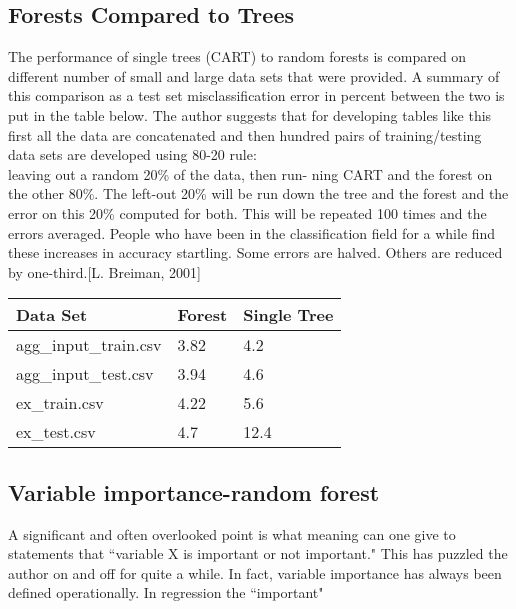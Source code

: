 \documentclass[journal]{/home/hoofar/LatexClasses/IEEEtran}
\begin{document}
\subsection*{Forests Compared to Trees}
The performance of single trees
(CART) to random forests is compared on different number of small
and large data sets that were provided. A
summary of this comparison as a test set misclassification error in percent between the two is put in the table below. The author suggests that for developing tables like this first all the data are concatenated and then hundred pairs of training/testing data sets are developed using 80-20 rule:\\
leaving out a random 20\% of the data, then run-
ning CART and the forest on the other 80\%. The
left-out 20\% will be run down the tree and the forest
and the error on this 20\% computed for both. This
will be repeated 100 times and the errors averaged. People who have been in the classification field for a while find these increases in
accuracy startling. Some errors are halved. Others
are reduced by one-third.[L. Breiman, 2001] 

\begin{table}[h!]
    \begin{tabular}{|l|l|l|}
        \hline
        Data Set            & Forest & Single Tree \\ \hline
        agg\_input\_train.csv & 3.82   & 4.2         \\ \hline
        agg\_input\_test.csv  & 3.94   & 4.6         \\ \hline
        ex\_train.csv        & 4.22   & 5.6         \\ \hline
        ex\_test.csv         & 4.7    & 12.4        \\ \hline
        
    \end{tabular}
\end{table}
\subsection*{Variable importance-random forest}
A significant and often overlooked point is what meaning can one give to statements that ``variable X is important or not important." This has puzzled the author on and off for quite a
while. In fact, variable importance has always been
defined operationally. In regression the ``important"
\end{document}
